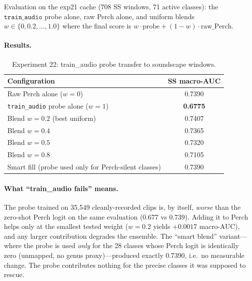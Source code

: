 Evaluation on the exp21 cache (708 SS windows, 71 active classes): the
$\texttt{train\_audio}$ probe alone, raw Perch alone, and uniform blends
$w \in \{0, 0.2, \ldots, 1.0\}$ where the final score is
$w \cdot \text{probe} + (1{-}w) \cdot \text{raw\_Perch}$.

\paragraph{Results.}
\begin{table}[h]
\centering
\caption{Experiment 22: train\_audio probe transfer to soundscape windows.}
\label{tab:exp22}
\begin{tabular}{lc}
\hline
\textbf{Configuration} & \textbf{SS macro-AUC} \\
\hline
Raw Perch alone ($w{=}0$)                    & 0.7390 \\
\texttt{train\_audio} probe alone ($w{=}1$)  & \textbf{0.6775} \\
Blend $w{=}0.2$ (best uniform)               & 0.7407 \\
Blend $w{=}0.4$                              & 0.7365 \\
Blend $w{=}0.5$                              & 0.7320 \\
Blend $w{=}0.8$                              & 0.7105 \\
Smart fill (probe used only for Perch-silent classes) & 0.7390 \\
\hline
\end{tabular}
\end{table}

\paragraph{What ``train\_audio fails'' means.}
The probe trained on 35{,}549 cleanly-recorded clips is, by itself,
\emph{worse} than the zero-shot Perch logit on the same evaluation
(0.677 vs 0.739). Adding it to Perch helps only at the smallest tested
weight ($w{=}0.2$ yields $+0.0017$ macro-AUC), and any larger contribution
degrades the ensemble. The ``smart blend'' variant---where the probe is
used \emph{only} for the 28 classes whose Perch logit is identically
zero (unmapped, no genus proxy)---produced exactly 0.7390, i.e.\ no
measurable change. The probe contributes nothing for the precise classes
it was supposed to rescue.

